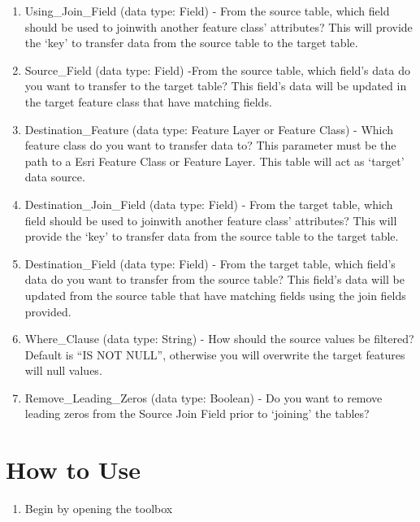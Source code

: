 \documentclass[]{article}
\providecommand{\tightlist}{%
  \setlength{\itemsep}{0pt}\setlength{\parskip}{0pt}}
\begin{document}
\begin{enumerate}
\def\labelenumi{\arabic{enumi}.}
\setcounter{enumi}{1}
\item
  Using\_Join\_Field (data type: Field) - From the source table, which
  field should be used to joinwith another feature class' attributes?
  This will provide the `key' to transfer data from the source table to
  the target table.
\item
  Source\_Field (data type: Field) -From the source table, which field's
  data do you want to transfer to the target table? This field's data
  will be updated in the target feature class that have matching fields.
\item
  Destination\_Feature (data type: Feature Layer or Feature Class) -
  Which feature class do you want to transfer data to? This parameter
  must be the path to a Esri Feature Class or Feature Layer. This table
  will act as `target' data source.
\item
  Destination\_Join\_Field (data type: Field) - From the target table,
  which field should be used to joinwith another feature class'
  attributes? This will provide the `key' to transfer data from the
  source table to the target table.
\item
  Destination\_Field (data type: Field) - From the target table, which
  field's data do you want to transfer from the source table? This
  field's data will be updated from the source table that have matching
  fields using the join fields provided.
\item
  Where\_Clause (data type: String) - How should the source values be
  filtered? Default is ``IS NOT NULL'', otherwise you will overwrite the
  target features will null values.
\item
  Remove\_Leading\_Zeros (data type: Boolean) - Do you want to remove
  leading zeros from the Source Join Field prior to `joining' the
  tables?
\end{enumerate}

\section{How to Use}\label{how-to-use}

\begin{enumerate}
\def\labelenumi{\arabic{enumi}.}
\tightlist
\item
  Begin by opening the toolbox
\end{enumerate}
\end{document}
